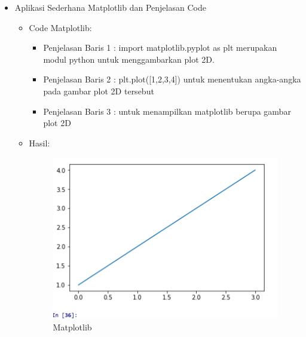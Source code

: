 \begin{enumerate}
\begin{itemize}
\begin{itemize}
\par
\par
\item Aplikasi Sederhana Matplotlib dan Penjelasan Code 
\begin{itemize}
\item Code Matplotlib:
\par 
\par
\begin{itemize}
\item Penjelasan  Baris 1 : import matplotlib.pyplot as plt merupakan modul python untuk menggambarkan plot 2D.
\par
\item Penjelasan  Baris 2 : plt.plot([1,2,3,4]) untuk menentukan angka-angka pada gambar plot 2D tersebut
\par
\item Penjelasan  Baris 3 : untuk menampilkan matplotlib berupa gambar plot 2D
\par
\end{itemize}
\item Hasil:
\par
\par
\begin{figure}[ht]
\centering
\includegraphics[scale=0.8]{figures/andi/Matplotlib.PNG}
\caption{Matplotlib}
\label{contoh}
\end{figure}
\par
\end{itemize}


\end{itemize}
\end{itemize}
\end{enumerate}
